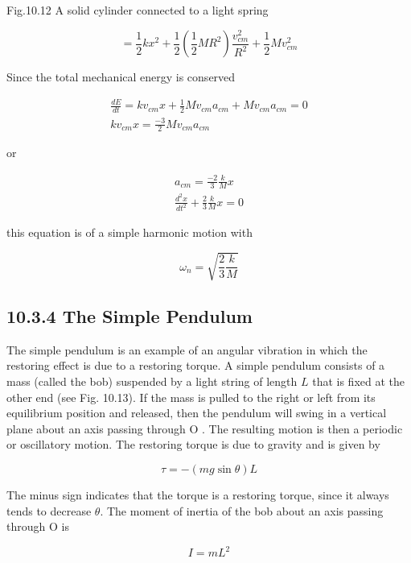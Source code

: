 \documentclass[10pt]{article}
\begin{document}
Fig.10.12 A solid cylinder connected to a light spring

$$
=\frac{1}{2} k x^{2}+\frac{1}{2}\left(\frac{1}{2} M R^{2}\right) \frac{v_{c m}^{2}}{R^{2}}+\frac{1}{2} M v_{c m}^{2}
$$

Since the total mechanical energy is conserved

$$
\begin{gathered}
\frac{d E}{d t}=k v_{c m} x+\frac{1}{2} M v_{c m} a_{c m}+M v_{c m} a_{c m}=0 \\
k v_{c m} x=\frac{-3}{2} M v_{c m} a_{c m}
\end{gathered}
$$

or

$$
\begin{gathered}
a_{c m}=\frac{-2}{3} \frac{k}{M} x \\
\frac{d^{2} x}{d t^{2}}+\frac{2}{3} \frac{k}{M} x=0
\end{gathered}
$$

this equation is of a simple harmonic motion with

$$
\omega_{n}=\sqrt{\frac{2}{3} \frac{k}{M}}
$$

\subsection*{10.3.4 The Simple Pendulum}
The simple pendulum is an example of an angular vibration in which the restoring effect is due to a restoring torque. A simple pendulum consists of a mass (called the bob) suspended by a light string of length $L$ that is fixed at the other end (see Fig. 10.13). If the mass is pulled to the right or left from its equilibrium position and released, then the pendulum will swing in a vertical plane about an axis passing through O . The resulting motion is then a periodic or oscillatory motion. The restoring torque is due to gravity and is given by

$$
\tau=-(m g \sin \theta) L
$$

The minus sign indicates that the torque is a restoring torque, since it always tends to decrease $\theta$. The moment of inertia of the bob about an axis passing through O is

$$
I=m L^{2}
$$
\end{document}
